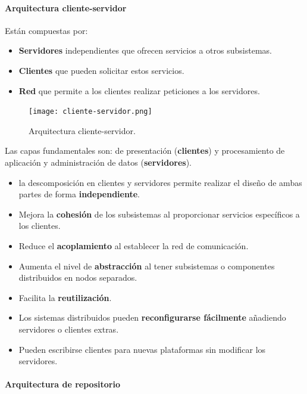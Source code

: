 \documentclass[12pt,spanish]{article}
\begin{document}
\paragraph{Arquitectura cliente-servidor\\}

Están compuestas por:

\begin{itemize}
	\item \textbf{Servidores} independientes que ofrecen servicios a otros subsistemas.
	\item \textbf{Clientes} que pueden solicitar estos servicios.
	\item \textbf{Red} que permite a los clientes realizar peticiones a los servidores.
\end{itemize}

\begin{figure}[H]
\centering
\texttt{[image: cliente-servidor.png]}
\caption{Arquitectura cliente-servidor.}
\end{figure}

Las capas fundamentales son: de presentación (\textbf{clientes}) y procesamiento de aplicación y administración de datos (\textbf{servidores}).

\begin{itemize}
	\item la descomposición en clientes y servidores permite realizar el diseño de ambas partes de forma \textbf{independiente}.
	\item Mejora la \textbf{cohesión} de los subsistemas al proporcionar servicios específicos a los clientes.
	\item Reduce el \textbf{acoplamiento} al establecer la red de comunicación.
	\item Aumenta el nivel de \textbf{abstracción} al tener subsistemas o componentes distribuidos en nodos separados.
	\item Facilita la \textbf{reutilización}.
	\item Los sistemas distribuidos pueden \textbf{reconfigurarse fácilmente} añadiendo servidores o clientes extras.
	 \item Pueden escribirse clientes para nuevas plataformas sin modificar los servidores.
\end{itemize}

\paragraph{Arquitectura de repositorio\\}
\end{document}
